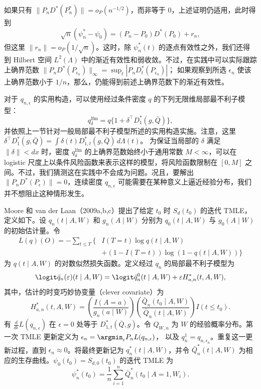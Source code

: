 如果只有 $\|P_nD^*(P_n^*)\|=o_P(n^{-1/2})$，而非等于 0，上述证明仍适用，此时得到
\[
 \sqrt n(\psi_n^*-\psi_0)=(P_n-P_0)D^*(P_0)+r_n,
\]
但这里 $\|r_n\|=o_P(1/\sqrt n)$。这时，除 $\psi_n^*(t)$ 的逐点有效性之外，我们还得到 Hilbert 空间 $L^2(\Lambda)$ 中的渐近有效性和弱收敛。不过，在实践中可以实际跟踪上确界范数
$\|P_nD^*(P_{\epsilon_n})\|_\infty=\sup_t|P_nD_t^*(P_{\epsilon_n})|$；
如果观察到所选 $\epsilon_n$ 使该上确界范数小于 $1/n$，那么，仍能得到前述上确界范数下的渐近有效性。

对于 $q_{n,\epsilon}$ 的实用构造，可以使用经过条件密度 $q$ 的下列无限维局部最不利子模型：
\[
 q_\delta^{\mathrm{lfm}}=q\{1+\delta^\top D_1^*(g,\bar Q)\},
\]
并依照上一节针对一般局部最不利子模型所述的实用构造实施。注意，这里
$\delta^\top D_1^*(g,\bar Q)=\int\delta(t)D_{1,t}^*(g,\bar Q)\,d\Lambda(t)$。
为保证当局部的 $\delta$ 满足 $\|\delta\|<dx$ 时，密度 $q_\delta^{\mathrm{lfm}}$ 的上确界范数始终小于通用常数 $M<\infty$，可以在 logistic 尺度上以条件风险函数来表示这样的模型，将风险函数限制在 $[0,M]$ 之间。不过，我们猜测这在实践中不会成为问题。况且，要解出 $\|P_nD^*(P_\epsilon)\|=0$，连续密度 $q_{n,\epsilon}$ 可能需要在某种意义上逼近经验分布，我们并不想阻止这种情形发生。

Moore 和 van der Laan（2009a,b,c）提出了给定 $t_0$ 时 $S_d(t_0)$ 的迭代 TMLE，定义如下。设 $q_n(t\mid A,W)$ 和 $g_n(A\mid W)$ 分别为 $q_0(t\mid A,W)$ 与 $g_0(A\mid W)$ 的初始估计量。令
\[
 \begin{aligned}
 L(q)(O)=-\sum_{t\leq T}\bigl\{
 &I(T=t)\log q(t\mid A,W)\\
 &+(1-I(T=t))\log(1-q(t\mid A,W))
 \bigr\}
 \end{aligned}
\]
为 $q(t\mid A,W)$ 的对数似然损失函数。定义经过 $q_n$ 的局部最不利子模型为
\[
 \logit\bar q_n(\varepsilon)(t\mid A,W)
 =\logit\bar q_n^0(t\mid A,W)
 +\varepsilon H_{a,n}^*(t,A,W),
\]
其中，估计的时变巧妙协变量（clever covariate）为
\[
 H_{a,n}^*(t,A,W)
 =\left(\frac{I(A=a)}{g_n(a\mid W)}\right)
 \left(\frac{\bar Q_n(t_0\mid A,W)}{\bar Q_n(t\mid A,W)}\right)
 I(t\leq t_0).
\]
有 $\frac{d}{d\epsilon}L(q_{n,\epsilon})$ 在 $\epsilon=0$ 处等于 $D_{1,t}^*(\bar Q,g)$。令 $Q_{W,n}$ 为 $W$ 的经验概率分布。第一次 TMLE 更新定义为
$\epsilon_n=\argmin_\epsilon P_nL(q_{n,\epsilon})$，
以及 $q_n^1=q_{n,\epsilon_n}$。重复这一更新过程，直到 $\epsilon_n\approx0$。将最终更新记为 $q_n^*(t\mid A,W)$，并令 $\bar Q_n^*(t\mid A,W)$ 为相应的生存曲线。$\psi_0(t_0)=S_{d,0}(t_0)$ 的迭代 TMLE 为
\[
 \psi_n^*(t_0)=\frac1n\sum_{i=1}^n\bar Q_n^*(t_0\mid A=1,W_i).
\]


